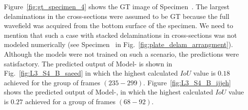 Figure~\ref{fig:gt_specimen_4} shows the GT image of Specimen~.
The largest delaminations in the cross-sections were assumed to be GT because the full wavefield was acquired from the bottom surface of the specimen.
We need to mention that such a case with stacked delaminations in cross-sections was not modeled numerically (see Specimen~ in Fig.~\ref{fig:plate_delam_arrangment}).
Although the models were not trained on such a scenario, the predictions were satisfactory.
The predicted output of Model- is shown in Fig.~\ref{fig:L3_S4_B_saeed} in which the highest calculated \(IoU\) value is \(0.18\) achieved for the group of frames \((235-299)\).
Figure~\ref{fig:L3_S4_B_ijjeh} shows the predicted output of Model-, in which the highest calculated \(IoU\) value is \(0.27\) achieved for a group of frames \((68-92)\).
